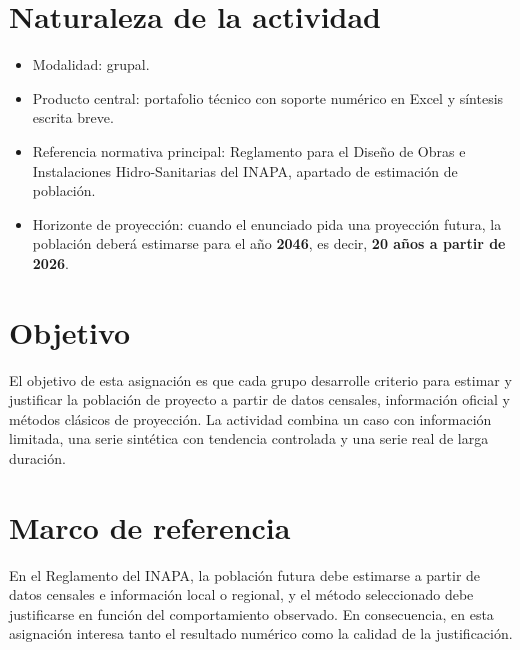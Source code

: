 \documentclass[12pt]{article}
\begin{document}

\section{Naturaleza de la actividad}
\begin{itemize}
\item Modalidad: grupal.
\item Producto central: portafolio técnico con soporte numérico en Excel y síntesis escrita breve.
\item Referencia normativa principal: Reglamento para el Diseño de Obras e Instalaciones Hidro-Sanitarias del INAPA, apartado de estimación de población.
\item Horizonte de proyección: cuando el enunciado pida una proyección futura, la población deberá estimarse para el año \textbf{2046}, es decir, \textbf{20 años a partir de 2026}.
\end{itemize}

\section{Objetivo}
El objetivo de esta asignación es que cada grupo desarrolle criterio para estimar y justificar la población de proyecto a partir de datos censales, información oficial y métodos clásicos de proyección. La actividad combina un caso con información limitada, una serie sintética con tendencia controlada y una serie real de larga duración.

\section{Marco de referencia}
En el Reglamento del INAPA, la población futura debe estimarse a partir de datos censales e información local o regional, y el método seleccionado debe justificarse en función del comportamiento observado. En consecuencia, en esta asignación interesa tanto el resultado numérico como la calidad de la justificación.

\end{document}
